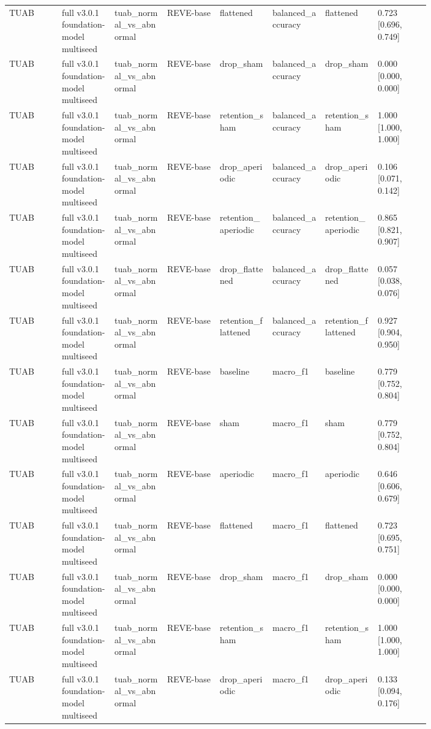 \begin{longtable}{p{0.10\linewidth}p{0.10\linewidth}p{0.10\linewidth}p{0.10\linewidth}p{0.10\linewidth}p{0.10\linewidth}p{0.10\linewidth}p{0.10\linewidth}}
TUAB & full v3.0.1 foundation-model multiseed & tuab\_normal\_vs\_abnormal & REVE-base & flattened & balanced\_accuracy & flattened & 0.723 [0.696, 0.749]\\
TUAB & full v3.0.1 foundation-model multiseed & tuab\_normal\_vs\_abnormal & REVE-base & drop\_sham & balanced\_accuracy & drop\_sham & 0.000 [0.000, 0.000]\\
TUAB & full v3.0.1 foundation-model multiseed & tuab\_normal\_vs\_abnormal & REVE-base & retention\_sham & balanced\_accuracy & retention\_sham & 1.000 [1.000, 1.000]\\
TUAB & full v3.0.1 foundation-model multiseed & tuab\_normal\_vs\_abnormal & REVE-base & drop\_aperiodic & balanced\_accuracy & drop\_aperiodic & 0.106 [0.071, 0.142]\\
TUAB & full v3.0.1 foundation-model multiseed & tuab\_normal\_vs\_abnormal & REVE-base & retention\_aperiodic & balanced\_accuracy & retention\_aperiodic & 0.865 [0.821, 0.907]\\
TUAB & full v3.0.1 foundation-model multiseed & tuab\_normal\_vs\_abnormal & REVE-base & drop\_flattened & balanced\_accuracy & drop\_flattened & 0.057 [0.038, 0.076]\\
TUAB & full v3.0.1 foundation-model multiseed & tuab\_normal\_vs\_abnormal & REVE-base & retention\_flattened & balanced\_accuracy & retention\_flattened & 0.927 [0.904, 0.950]\\
TUAB & full v3.0.1 foundation-model multiseed & tuab\_normal\_vs\_abnormal & REVE-base & baseline & macro\_f1 & baseline & 0.779 [0.752, 0.804]\\
TUAB & full v3.0.1 foundation-model multiseed & tuab\_normal\_vs\_abnormal & REVE-base & sham & macro\_f1 & sham & 0.779 [0.752, 0.804]\\
TUAB & full v3.0.1 foundation-model multiseed & tuab\_normal\_vs\_abnormal & REVE-base & aperiodic & macro\_f1 & aperiodic & 0.646 [0.606, 0.679]\\
TUAB & full v3.0.1 foundation-model multiseed & tuab\_normal\_vs\_abnormal & REVE-base & flattened & macro\_f1 & flattened & 0.723 [0.695, 0.751]\\
TUAB & full v3.0.1 foundation-model multiseed & tuab\_normal\_vs\_abnormal & REVE-base & drop\_sham & macro\_f1 & drop\_sham & 0.000 [0.000, 0.000]\\
TUAB & full v3.0.1 foundation-model multiseed & tuab\_normal\_vs\_abnormal & REVE-base & retention\_sham & macro\_f1 & retention\_sham & 1.000 [1.000, 1.000]\\
TUAB & full v3.0.1 foundation-model multiseed & tuab\_normal\_vs\_abnormal & REVE-base & drop\_aperiodic & macro\_f1 & drop\_aperiodic & 0.133 [0.094, 0.176]\\

\end{longtable}
